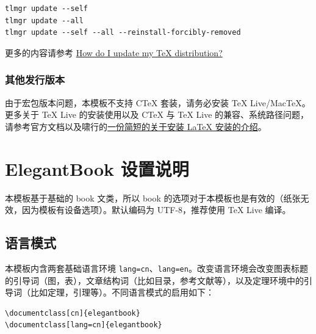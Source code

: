 \documentclass[lang=cn,newtx,10pt,scheme=chinese]{elegantbook}
\begin{document}
\begin{lstlisting}
tlmgr update --self 
tlmgr update --all
tlmgr update --self --all --reinstall-forcibly-removed
\end{lstlisting}

更多的内容请参考 \href{https://tex.stackexchange.com/questions/55437/how-do-i-update-my-tex-distribution}{How do I update my \TeX{} distribution?}

\subsection{其他发行版本}

由于宏包版本问题，本模板不支持 C\TeX{} 套装，请务必安装 TeX Live/Mac\TeX{}。更多关于 \TeX{} Live 的安装使用以及 C\TeX{} 与 \TeX{} Live 的兼容、系统路径问题，请参考官方文档以及啸行的\href{https://github.com/OsbertWang/install-latex-guide-zh-cn/releases/}{一份简短的关于安装 \LaTeX{} 安装的介绍}。



\chapter{ElegantBook 设置说明}

本模板基于基础的 book 文类，所以 book 的选项对于本模板也是有效的（纸张无效，因为模板有设备选项）。默认编码为 UTF-8，推荐使用 \TeX{} Live 编译。

\section{语言模式}
本模板内含两套基础语言环境 \lstinline{lang=cn}、\lstinline{lang=en}。改变语言环境会改变图表标题的引导词（图，表），文章结构词（比如目录，参考文献等），以及定理环境中的引导词（比如定理，引理等）。不同语言模式的启用如下：
\begin{lstlisting}
\documentclass[cn]{elegantbook} 
\documentclass[lang=cn]{elegantbook}
\end{lstlisting}
\end{document}
